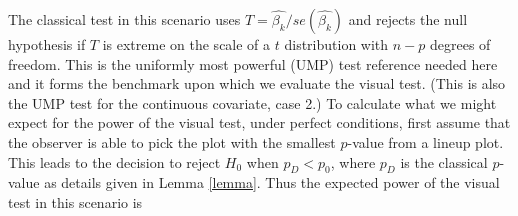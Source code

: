 \documentclass{article}
\newcommand{\red}[1]{{\color{red} #1}}
\newcommand{\green}[1]{{\color{green} #1}} %
\begin{document}

The classical test in this scenario uses $T= \hat{\beta_k}/ se(\hat{\beta_k})$ and rejects the null hypothesis if $T$ is extreme on the scale of a $t$ distribution with $n-p$ degrees of freedom. This is the uniformly most powerful (UMP) test \green{reference needed here} and it forms the benchmark upon which we evaluate the visual test. (This is also the UMP test for the continuous covariate, case 2.) To calculate what we might expect for the power of the visual test, under perfect conditions, first assume that the observer is able to pick the plot with the smallest $p$-value from a lineup plot.  This leads to the decision to reject $H_0$ when $p_{D} < p_0$, where $p_{D}$ is the classical $p$-value as details given in Lemma \ref{lemma}. Thus the expected power of the visual test in this scenario is
\end{document}
